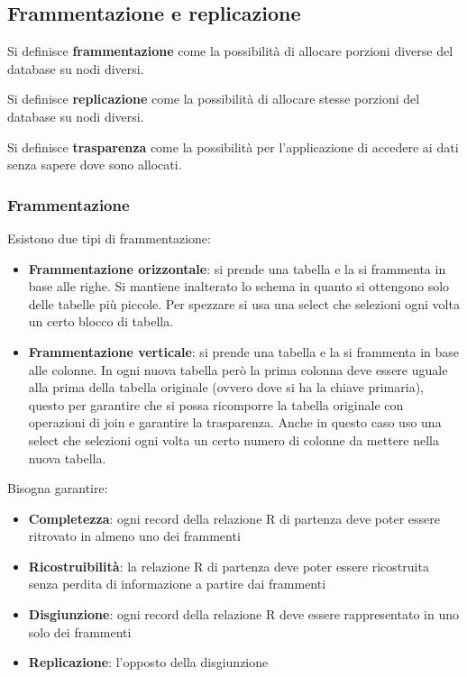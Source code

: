\subsection{Frammentazione e replicazione}
\begin{definizione}
    Si definisce \textbf{frammentazione} come la possibilità di allocare porzioni
    diverse del database su nodi diversi.
\end{definizione}
\begin{definizione}
    Si definisce \textbf{replicazione} come la possibilità di allocare stesse
    porzioni del database su nodi diversi.
\end{definizione}
\begin{definizione}
    Si definisce \textbf{trasparenza} come la possibilità per l'applicazione di
    accedere ai dati senza sapere dove sono allocati.
\end{definizione}
\subsubsection{Frammentazione}
Esistono due tipi di frammentazione:
\begin{itemize}
    \item \textbf{Frammentazione orizzontale}: si prende una tabella e la si
          frammenta in base alle righe. Si mantiene inalterato lo schema in
          quanto si ottengono solo delle tabelle più piccole. Per spezzare si
          usa una select che selezioni ogni volta un certo blocco di tabella.
    \item \textbf{Frammentazione verticale}: si prende una tabella e la si frammenta
          in base alle colonne. In ogni nuova tabella però la prima colonna
          deve essere uguale alla prima della tabella originale (ovvero dove si
          ha la chiave primaria), questo per garantire che si possa ricomporre
          la tabella originale con operazioni di join e garantire la
          trasparenza. Anche in questo caso uso una select che selezioni ogni
          volta un certo numero di colonne da mettere nella nuova tabella.
\end{itemize}
Bisogna garantire:
\begin{itemize}
    \item \textbf{Completezza}: ogni record della relazione R di partenza
          deve poter essere ritrovato in almeno uno dei frammenti
    \item \textbf{Ricostruibilità}: la relazione R di partenza deve poter essere
          ricostruita senza perdita di informazione a partire dai frammenti
    \item \textbf{Disgiunzione}: ogni record della relazione R deve essere
          rappresentato in uno solo dei frammenti
    \item \textbf{Replicazione}: l'opposto della disgiunzione
\end{itemize}
